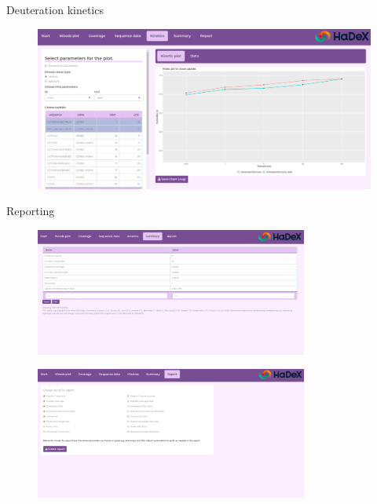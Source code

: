 \documentclass{beamer}\usepackage[]{graphicx}\usepackage[]{color}
\begin{document}


\begin{frame}{Deuteration kinetics}
\begin{figure} 
\includegraphics[width=\textwidth]{static_figure/HaDeX-6.png}
\end{figure}
\end{frame}


\begin{frame}{Reporting}
\begin{figure} 
\includegraphics[width=0.8\textwidth]{static_figure/HaDeX-7.png}
\end{figure}

\begin{figure} 
\includegraphics[width=0.8\textwidth]{static_figure/HaDeX-8.png}
\end{figure}
\end{frame}
\end{document}
